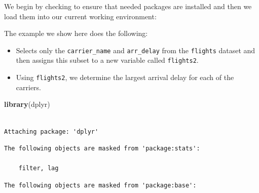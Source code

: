 \documentclass[twoside,12pt,final]{ucthesis-CA2012}
\newenvironment{Shaded}{}{}
\newcommand{\KeywordTok}[1]{\textcolor[rgb]{0.00,0.44,0.13}{\textbf{{#1}}}}
\newcommand{\DataTypeTok}[1]{\textcolor[rgb]{0.56,0.13,0.00}{{#1}}}
\newcommand{\StringTok}[1]{\textcolor[rgb]{0.25,0.44,0.63}{{#1}}}
\newcommand{\CommentTok}[1]{\textcolor[rgb]{0.38,0.63,0.69}{\textit{{#1}}}}
\newcommand{\NormalTok}[1]{{#1}}
\newcommand{\OperatorTok}[1]{\textcolor[rgb]{0.00,0.44,0.13}{\textbf{{#1}}}}
\newcommand{\ControlFlowTok}[1]{\textcolor[rgb]{0.00,0.44,0.13}{\textbf{{#1}}}}
\begin{document}
\begin{ucmainmatter}
We begin by checking to ensure that needed packages are installed and then we load them into our current working environment:
\begin{Shaded}
\end{Shaded}
\clearpage

The example we show here does the following:
\begin{itemize}
\item
  Selects only the \texttt{carrier\_name} and \texttt{arr\_delay} from the \texttt{flights} dataset and then assigns this subset to a new variable called \texttt{flights2}.
\item
  Using \texttt{flights2}, we determine the largest arrival delay for each of the carriers.
\end{itemize}
\begin{Shaded}
\begin{Highlighting}[]
\KeywordTok{library}\NormalTok{(dplyr)}
\end{Highlighting}
\end{Shaded}
\begin{verbatim}

Attaching package: 'dplyr'
\end{verbatim}
\begin{verbatim}
The following objects are masked from 'package:stats':

    filter, lag
\end{verbatim}
\begin{verbatim}
The following objects are masked from 'package:base':


\end{verbatim}
\end{ucmainmatter}
\end{document}
